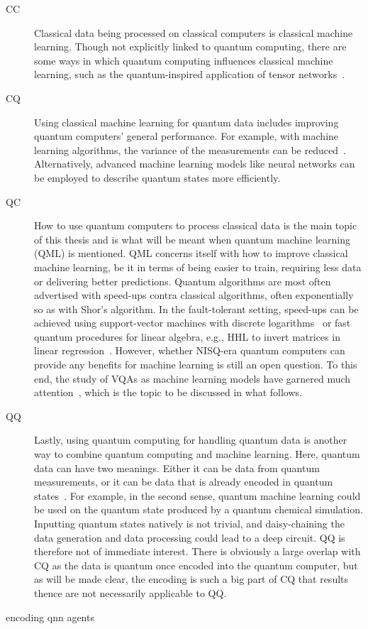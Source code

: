 \begin{description}
    \item[CC]
        Classical data being processed on classical computers is classical machine learning.
        Though not explicitly linked to quantum computing, there are some ways in which quantum computing influences classical machine learning, such as the quantum-inspired application of tensor networks~\autocite{felser2021}.

    \item[CQ]
        Using classical machine learning for quantum data includes improving quantum computers' general performance.
        For example, with machine learning algorithms, the variance of the measurements can be reduced~\autocite{torlai2020}.
        Alternatively, advanced machine learning models like neural networks can be employed to describe quantum states more efficiently.


    \item[QC]
        How to use quantum computers to process classical data is the main topic of this thesis and is what will be meant when quantum machine learning (QML) is mentioned.
        QML concerns itself with how to improve classical machine learning, be it in terms of being easier to train, requiring less data or delivering better predictions.
        Quantum algorithms are most often advertised with speed-ups contra classical algorithms, often exponentially so as with Shor's algorithm.
        In the fault-tolerant setting, speed-ups can be achieved using support-vector machines with discrete logarithms~\autocite{liu2021} or fast quantum procedures for linear algebra, e.g., HHL to invert matrices in linear regression~\autocite{wiebe2012}.
        However, whether NISQ-era quantum computers can provide any benefits for machine learning is still an open question.
        To this end, the study of VQAs as machine learning models have garnered much attention~\autocite{benedetti2019}, which is the topic to be discussed in what follows.

    \item[QQ]
        Lastly, using quantum computing for handling quantum data is another way to combine quantum computing and machine learning.
        Here, quantum data can have two meanings.
        Either it can be data from quantum measurements, or it can be data that is already encoded in quantum states~\autocite{schuld2021a}.
        For example, in the second sense, quantum machine learning could be used on the quantum state produced by a quantum chemical simulation.
        Inputting quantum states natively is not trivial, and daisy-chaining the data generation and data processing could lead to a deep circuit.
        QQ is therefore not of immediate interest.
        There is obviously a large overlap with CQ as the data is quantum once encoded into the quantum computer, but as will be made clear, the encoding is such a big part of CQ that results thence are not necessarily applicable to QQ.

\end{description}



{encoding}
{qnn}
{agents}